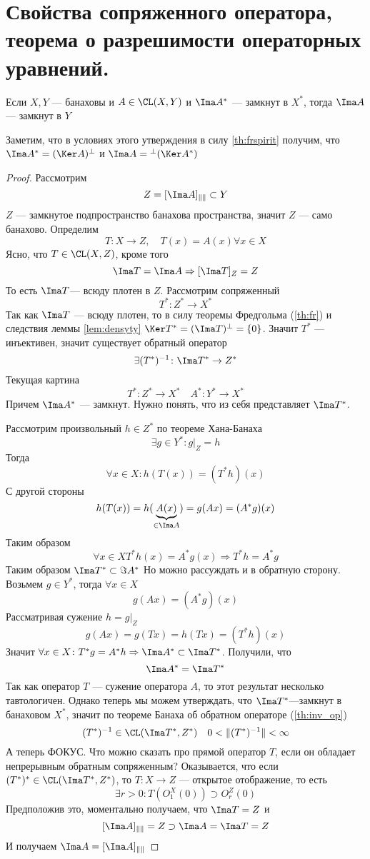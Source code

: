 \newpage
\section{Свойства сопряженного оператора, теорема о разрешимости операторных уравнений.}
\begin{claim}
	Если $X,Y$ --- банаховы и $A \in \CL(X,Y)$ и $\Ima A^*$ --- замкнут в $X^*$, тогда $\Ima A$ --- замкнут в $Y$
\end{claim}
Заметим, что в условиях этого утверждения в силу \ref{th:frspirit} получим, что $\Ima A^* = (\Ker A)^\perp$ и $\Ima A = {}^\perp(\Ker A^*)$
\begin{proof}
	Рассмотрим
	$$
	Z = [\Ima A]_{\|\|} \subset Y
	$$
	$Z$ --- замкнутое подпространство банахова пространства, значит $Z$ --- само банахово. Определим
	$$
	T \colon X \to Z, \quad T(x)  = A(x) \forall x\in X 
	$$
	Ясно, что $T \in \CL(X,Z)$, кроме того 
	$$
	 \Ima T = \Ima A \Rightarrow [\Ima T]_{Z}  = Z 
	$$
	То есть $\Ima T$--- всюду плотен в $Z$. Рассмотрим сопряженный
	$$
	T^* \colon Z^* \to X^*
	$$
	Так как $\Ima T$ --- всюду плотен, то в силу теоремы Фредгольма (\ref{th:fr}) и следствия леммы \ref{lem:densyty} $\Ker T^* = (\Ima T)^\perp = \{0\}$. Значит $T^*$ --- инъективен, значит существует обратный оператор
	$$
	\exists (T^*)^{-1}\colon \Ima T^* \to Z^*
	$$
	Текущая картина
	$$
	T^* \colon Z^* \to X^* \quad A^* \colon Y^* \to X^* 
	$$
	Причем $\Ima A^*$ --- замкнут. Нужно понять, что из себя представляет $\Ima T^*$. 
	
	Рассмотрим произвольный $h \in Z^*$ по теореме Хана-Банаха 
	$$
	\exists g \in Y^*\colon g\big|_{Z}= h
	$$
	Тогда 
	$$
	\forall x \in X\colon h(T(x)) = (T^*h)(x)
	$$
	С другой стороны 
	$$
	h(T(x))  = h(\underbrace{A(x)}_{\in \Ima A})  = g(Ax)  = (A^*g)(x)
	$$
	Таким образом
	$$
	\forall x \in X T^*h(x) = A^*g(x) \Rightarrow T^*h = A^* g
	$$
	Таким образом $ \Ima T^* \subset \Im A^*$
	Но можно рассуждать и в обратную сторону. Возьмем $g \in Y^*$, тогда $\forall x \in X$
	$$
	g(Ax) = (A^*g)(x)
	$$
	Рассматривая сужение $h = g\big|_Z$
	$$
	g(Ax) = g(Tx) = h(Tx) = (T^*h)(x)
	$$
	Значит $\forall x \in X \colon T^*g = A^*h \Rightarrow \Ima A^* \subset \Ima T^*$. Получили, что
	$$
	\Ima A^* = \Ima T^*
	$$
	Так как оператор $T$ --- сужение оператора $A$, то этот результат несколько тавтологичен. Однако теперь мы можем утверждать, что $\Ima T^*$---замкнут в банаховом $X^*$, значит по теореме Банаха об обратном операторе (\ref{th:inv_op}) 
	$$
	(T^*)^{-1} \in \CL(\Ima T^*, Z^*) \quad 0< \|(T^*)^{-1}\| < \infty
	$$
	А теперь ФОКУС. Что можно сказать про прямой оператор $T$, если он обладает непрерывным обратным сопряженным?
	Оказывается, что если $(T^*)^* \in \CL(\Ima T^*, Z^*)$, то $T \colon X \to Z$ --- открытое отображение, то есть 
	$$
	\exists r>0 \colon T(O_1^X(0)) \supset O_r^Z(0)
	$$
	Предположив это, моментально получаем, что $\Ima T = Z$ и 
	$$
	[\Ima A]_{\|\|} = Z \supset \Ima A = \Ima T = Z 
	$$
	И получаем $\Ima A = [\Ima A]_{\|\|}$
	

\end{proof}
